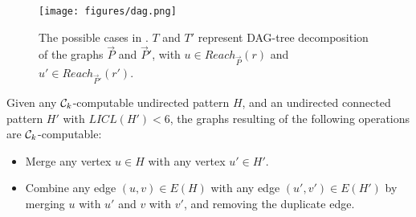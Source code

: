 \documentclass[a4paper,UKenglish,cleveref, autoref, numberwithinsect, thm-restate]{lipics-v2021}
\newcommand{\computable}[1]{${#1}$-computable}
\newcommand{\cycle}[1]{\cC_{#1}}
\newcommand{\LICL}{LICL}
\newcommand{\Reachable}{Reach}
\newcommand{\dagtree}{DAG-tree decomposition}
\newcommand{\cC}{{\cal C}}
\begin{document}
	\begin{figure}
		\centering
		\texttt{[image: figures/dag.png]}\caption{The possible cases in . $T$ and $T'$ represent \dagtree{} of the graphs $\vec{P}$ and $\vec{P}'$, with $u \in \Reachable_{\vec{P}}(r)$ and $u' \in \Reachable_{\vec{P}'}(r')$.}
		\label{fig:dag}
	\end{figure}
	
	
	\begin{lemma} \label{lem:complexpattern}
		Given any \computable{\cycle{k}} undirected pattern $H$, and an undirected connected pattern $H'$ with $\LICL(H')<6$, the graphs resulting of the following operations are \computable{\cycle{k}}:
		\begin{itemize}
			\item Merge any vertex $u \in H$ with any vertex $u' \in H'$.
			\item Combine any edge $(u,v) \in E(H)$ with any edge $(u',v') \in E(H')$ by merging $u$ with $u'$ and $v$ with $v'$, and removing the duplicate edge.
		\end{itemize}
	\end{lemma}
\end{document}
